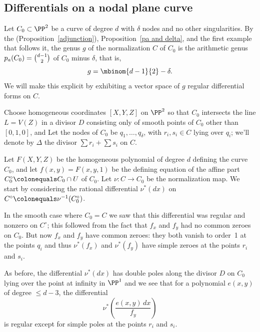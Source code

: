 \subsection{Differentials on a nodal plane curve}\label{canonical series on nodal plane curves}

Let $C_{0} \subset \PP^2$  be a curve of degree $d$ with $\delta$
nodes and no other singularities. By the 
%
%
%
 (Proposition~\ref{adjunction}), 
Proposition~\ref{pa and delta}, and the first example that follows it, 
the genus $g$ of the normalization $C$ of $C_{0}$ is
the arithmetic genus $p_{a}(C_{0}) = \tbinom{d-1}{2}$ 
of $C_{0}$ minus $\delta$, that is,
$$
g = \mbinom{d-1}{2} -\delta.
$$
We will make this explicit by 
%
%
exhibiting a vector space of $g$ regular differential forms on $C$.

Choose homogeneous coordinates  $[X,Y,Z]$ on $\PP^2$ so that
$C_0$ intersects the line $L = V(Z)$ in a divisor $D$ consisting only
of smooth points of $C_{0}$  other than $[0,1,0]$, and 
Let the nodes of $C_0$ be $q_1,\dots,q_\delta$, with $r_i, s_i \in C$ lying 
over $q_i$; we'll denote by $\Delta$ the divisor $\sum r_i + \sum s_i$ on $C$. 

Let $F(X,Y,Z)$ be the homogeneous polynomial of degree $d$ defining
the curve $C_0$, and let $f(x,y) = F(x,y,1)$ be the defining equation
of the affine part $C_{0}^{\circ}\colonequals  C_0 \cap U$ of $C_0$.
Let $\nu: C\to C_0$ be the normalization map. We start by considering
the rational differential 
%
$\nu^*(dx)$ on 
$C^{\circ}\colonequals  \nu^{-1}(C_{0}^{\circ})$. 

In the smooth case where $C_{0}=C$ we saw that this differential was
regular and nonzero on $C^{\circ}$; this followed from the fact 
that $f_{x}$ and $f_{y}$ had no common zeroes on $C_0$. But now
$f_{x}$ and $f_{y}$ have common zeroes: they both vanish to order~1 at
the points $q_{i}$ and thus $\nu^*(f_{x})$ and $\nu^*(f_{y})$ have
simple zeroes at the points $r_i$ and $s_i$.

As before, the differential $\nu^*(dx)$ 
has  double poles along the divisor
$D$ on $C_{0}$ lying over the point at infinity in $\PP^{1}$
and we see that for a polynomial $e(x,y)$ of degree $\leq d-3$, the
differential
$$
\nu^*\left( \frac{e(x,y)\,dx}{f_{y}}\right)
$$
is regular except for simple poles at the points $r_i$ and $s_i$.

